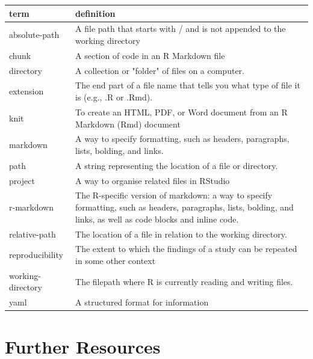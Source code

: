 \documentclass[
  oneside]{book}
\begin{document}
\begin{tabular}{l|l}
\hline
term & definition\\
\hline
absolute-path & A file path that starts with / and is not appended to the working directory\\
\hline
chunk & A section of code in an R Markdown file\\
\hline
directory & A collection or "folder" of files on a computer.\\
\hline
extension & The end part of a file name that tells you what type of file it is (e.g., .R or .Rmd).\\
\hline
knit & To create an HTML, PDF, or Word document from an R Markdown (Rmd) document\\
\hline
markdown & A way to specify formatting, such as headers, paragraphs, lists, bolding, and links.\\
\hline
path & A string representing the location of a file or directory.\\
\hline
project & A way to organise related files in RStudio\\
\hline
r-markdown & The R-specific version of markdown: a way to specify formatting, such as headers, paragraphs, lists, bolding, and links, as well as code blocks and inline code.\\
\hline
relative-path & The location of a file in relation to the working directory.\\
\hline
reproducibility & The extent to which the findings of a study can be repeated in some other context\\
\hline
working-directory & The filepath where R is currently reading and writing files.\\
\hline
yaml & A structured format for information\\
\hline
\end{tabular}

\hypertarget{resources-repro}{%
\section{Further Resources}\label{resources-repro}}
\end{document}
